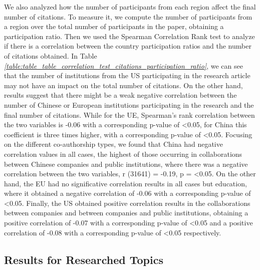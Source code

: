 We also analyzed how the number of participants from each region affect the final number of citations. To measure it, we compute the number of participants from a region over the total number of participants in the paper, obtaining a participation ratio. Then we used the Spearman Correlation Rank test to analyze if there is a correlation between the country participation ratios and the number of citations obtained. In Table \textit{\ref{table:table_table_correlation_test_citations_participation_ratio}}, we can see that the number of institutions from the US participating in the research article may not have an impact on the total number of citations. On the other hand, results suggest that there might be a weak negative correlation between the number of Chinese or European institutions participating in the research and the final number of citations. While for the UE, Spearman’s rank correlation between the two variables is -0.06 with a corresponding p-value of <0.05, for China this coefficient is three times higher, with a corresponding p-value of <0.05. Focusing on the different co-authorship types, we found that China had negative correlation values in all cases, the highest of those occurring in collaborations between Chinese companies and public institutions, where there was a negative correlation between the two variables, r (31641) = -0.19, p = <0.05. On the other hand, the EU had no significative correlation results in all cases but education, where it obtained a negative correlation of -0.06 with a corresponding p-value of <0.05. Finally, the US obtained positive correlation results in the collaborations between companies and between companies and public institutions, obtaining a positive correlation of -0.07 with a corresponding p-value of <0.05 and a positive correlation of -0.08 with a corresponding p-value of <0.05 respectively.

\subsection{Results for Researched Topics}

